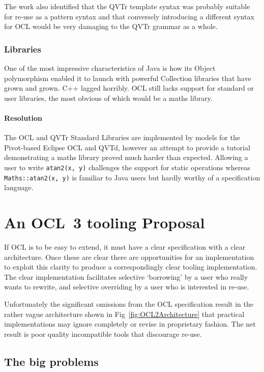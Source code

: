 \documentclass{jot}
\begin{document}
The work also identified that the QVTr template syntax was probably suitable for re-use as a pattern syntax and that conversely introducing a different syntax for OCL would be very damaging to the QVTr grammar as a whole.

\subsubsection{Libraries}

One of the most impressive characteristics of Java is how its Object polymorphism enabled it to launch with powerful Collection libraries that have grown and grown. C++ lagged horribly. OCL still lacks support for standard or user libraries, the most obvious of which would be a maths library.

\paragraph{Resolution}

The OCL and QVTr Standard Libraries are implemented by models for the Pivot-based Eclipse OCL and QVTd, however an attempt to provide a tutorial demonstrating a maths library proved much harder than expected. Allowing a user to write \verb$atan2(x, y)$ challenges the support for static operations whereas \verb$Maths::atan2(x, y)$ is familiar to Java users but hardly worthy of a specification language.

\section{An OCL~3 tooling Proposal}\label{OCL~3 tooling Proposal}

If OCL is to be easy to extend, it must have a clear specification with a clear architecture. Once these are clear there are opportunities for an implementation to exploit this clarity to produce a correspondingly clear tooling implementation. The clear implementation facilitates selective `borrowing' by a user who really wants to rewrite, and selective overriding by a user who is interested in re-use.

Unfortunately the significant omissions from the OCL specification result in the rather vague architecture shown in Fig~\ref{fig:OCL2Architecture} that practical implementations may ignore completely or revise in proprietary fashion. The net result is poor quality incompatible tools that discourage re-use.

\subsection{The big problems}
\end{document}
